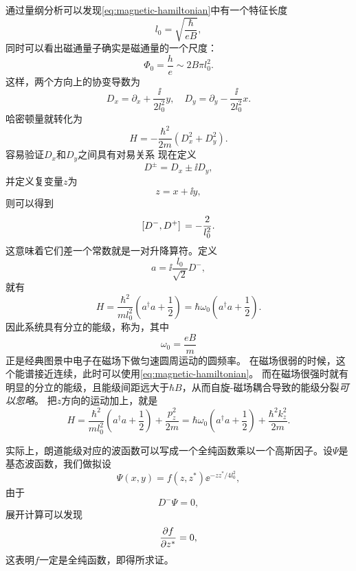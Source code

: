 通过量纲分析可以发现\eqref{eq:magnetic-hamiltonian}中有一个特征长度
\begin{equation}
    l_0 = \sqrt{\frac{\hbar}{e B}},
\end{equation}
同时可以看出磁通量子确实是磁通量的一个尺度：
\[
    \Phi_0 = \frac{h}{e} \sim 2 B \pi l_0^2.
\]
这样，两个方向上的协变导数为
\begin{equation}
    D_x = \partial_x + \frac{\ii}{2l_0^2} y, \quad D_y = \partial_y - \frac{\ii}{2l_0^2}x.
\end{equation}
哈密顿量就转化为
\[
    {H} = - \frac{\hbar^2}{2m} (D_x^2 + D_y^2).
\]
容易验证$D_x$和$D_y$之间具有对易关系
现在定义
\begin{equation}
    D^\pm = D_x \pm \ii D_y,
\end{equation}
并定义复变量$z$为
\begin{equation}
    z = x + \ii y,
\end{equation}
则可以得到
\begin{equation}
    \comm*{D^-}{D^+} = - \frac{2}{l_0^2}.
\end{equation}
这意味着它们差一个常数就是一对升降算符。定义
\begin{equation}
    {a} = \ii \frac{l_0}{\sqrt{2}} D^-,
\end{equation}
就有
\begin{equation}
    {H} = \frac{\hbar^2}{m l_0^2} \left({a}^\dagger {a} + \frac{1}{2} \right) = \hbar \omega_0 \left({a}^\dagger {a} + \frac{1}{2} \right).
    \label{eq:landau-energy-level}
\end{equation}
因此系统具有分立的能级，称为，其中
\begin{equation}
    \omega_0 = \frac{eB}{m}
\end{equation}
正是经典图景中电子在磁场下做匀速圆周运动的圆频率。
在磁场很弱的时候，这个能谱接近连续，此时可以使用\eqref{eq:magnetic-hamiltonian}。
而在磁场很强时就有明显的分立的能级，且能级间距远大于$\hbar B$，从而自旋-磁场耦合导致的能级分裂\emph{可以忽略}。
把$z$方向的运动加上，就是
\begin{equation}
    {H} = \frac{\hbar^2}{m l_0^2} \left({a}^\dagger {a} + \frac{1}{2} \right) + \frac{p_z^2}{2m} = \hbar \omega_0 \left({a}^\dagger {a} + \frac{1}{2} \right) + \frac{\hbar^2 k_z^2}{2m}.
    \label{eq:landau-energy-3d}
\end{equation}

实际上，朗道能级对应的波函数可以写成一个全纯函数乘以一个高斯因子。设$\Psi$是基态波函数，我们做拟设
\begin{equation}
    \Psi(x, y) = f(z, z^*) \ee^{- z z^* / 4l_0^2},
    \label{eq:landau-wave-packet}
\end{equation}
由于
\[
    D^- \Psi = 0,
\]
展开计算可以发现
\[
    \pdv{f}{z^*} = 0,
\]
这表明$f$一定是全纯函数，即得所求证。

